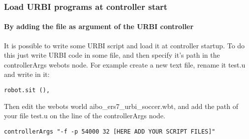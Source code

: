 \subsubsection{Load URBI programs at controller start}
\label{webots.firstrun.loadprograms}%

\paragraph{By adding the file as argument of the URBI controller}
\label{webots.firstrun.loadprograms.cmd_line}%

It is possible to write some URBI script and load it at controller
startup.  To do this just write URBI code in some file, and then
specify it's path in the controllerArgs webots node.  For example
create a new text file, rename it test.u and write in it:


\begin{lstlisting}[firstnumber=1,]
robot.sit (),
\end{lstlisting}

Then edit the webots world aibo\_ers7\_urbi\_soccer.wbt, and add the
path of your file test.u on the line of the controllerArgs node.


\begin{lstlisting}[firstnumber=1,]
controllerArgs "-f -p 54000 32 [HERE ADD YOUR SCRIPT FILES]"
\end{lstlisting}

